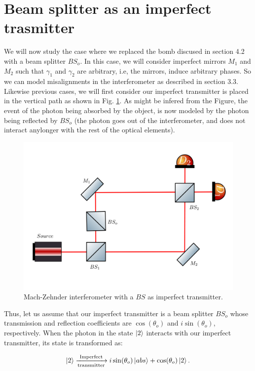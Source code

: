 \documentclass[12pt]{book}
\begin{document}
\section[$BS$ as an imperfect transmitter]{Beam splitter as an imperfect trasmitter}

We will now study the case where we replaced the bomb discused in section 4.2 with a beam splitter $BS_{o}$. In this case, we will consider imperfect mirrors $M_{1}$ and $M_{2}$ such that $\gamma_{1}$ and $\gamma_{2}$ are arbitrary, i.e, the mirrors, induce arbitrary phases. So we can model misalignments in the interferometer as described in section 3.3.  Likewise  previous cases, we will first consider our imperfect transmitter is placed in the vertical path as shown in Fig. \ref{bs vertical}. As might be infered from the Figure, the event of the photon being absorbed by the object, is now modeled by the photon being reflected by $BS_{o}$ (the photon goes out of the interferometer, and does not interact anylonger with the rest of the optical elements).



\begin{figure}[t!]
\centering
\includegraphics[width=\linewidth,height=7.5 cm]{images/machzenhderbs.png}
\caption{Mach-Zehnder interferometer with a $BS$ as imperfect transmitter.}
\label{bs vertical}
\end{figure}

Thus, let us assume that our imperfect transmitter is a beam splitter $BS_{o}$ whose transmission and reflection coefficients are $\cos(\theta_{o})$ and $i\sin(\theta_{o})$, respectively. When the photon in the state $\ket{2}$ interacts with our imperfect transmitter, its state is transformed as:

\begin{align}
\ket{2}\xrightarrow[\text{transmitter}]{\text{Imperfect}}i\sin(\theta_{o}) \ket{abs} +\cos(\theta_{o}) \ket{2}.
\end{align}
\end{document}
